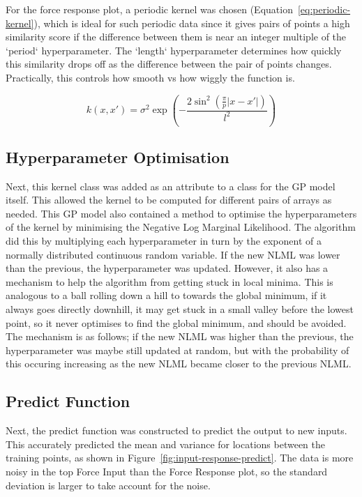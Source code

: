 \documentclass[12pt]{article}
\begin{document}
    For the force response plot, a periodic kernel was chosen (Equation~\ref{eq:periodic-kernel}), which is ideal for such periodic data since it gives pairs of points a high similarity score if the difference between them is near an integer multiple of the `period` hyperparameter.
    The `length` hyperparameter determines how quickly this similarity drops off as the difference between the pair of points changes.
    Practically, this controls how smooth vs how wiggly the function is.

    \begin{equation}
        k(x, x') = \sigma^2 \exp\left(- \frac{2 \sin^2\left(\frac{\pi}{p} |x - x'|\right)}{l^2}\right)\label{eq:periodic-kernel}
    \end{equation}

    \subsection{Hyperparameter Optimisation}
    Next, this kernel class was added as an attribute to a class for the GP model itself.
    This allowed the kernel to be computed for different pairs of arrays as needed.
    This GP model also contained a method to optimise the hyperparameters of the kernel by minimising the Negative Log Marginal Likelihood.
    The algorithm did this by multiplying each hyperparameter in turn by the exponent of a normally distributed continuous random variable.
    If the new NLML was lower than the previous, the hyperparameter was updated.
    However, it also has a mechanism to help the algorithm from getting stuck in local minima.
    This is analogous to a ball rolling down a hill to towards the global minimum, if it always goes directly downhill, it may get stuck in a small valley before the lowest point, so it never optimises to find the global minimum, and should be avoided.
    The mechanism is as follows; if the new NLML was higher than the previous, the hyperparameter was maybe still updated at random, but with the probability of this occuring increasing as the new NLML became closer to the previous NLML\@.

    \subsection{Predict Function}
    Next, the predict function was constructed to predict the output to new inputs.
    This accurately predicted the mean and variance for locations between the training points, as shown in Figure~\ref{fig:input-response-predict}.
    The data is more noisy in the top Force Input than the Force Response plot, so the standard deviation is larger to take account for the noise.
\end{document}
